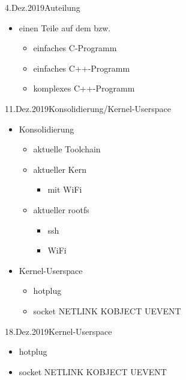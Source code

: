 \documentclass{beamer}
\begin{document}
\begin{frame}{4.Dez.2019}{Auteilung }
 \begin{itemize}
 \item einen Teile auf dem \host bzw. \target 
 \begin{itemize}
  \item einfaches C-Programm
  \item einfaches C++-Programm
  \item komplexes C++-Programm
 \end{itemize}
 \end{itemize}
\end{frame}

\begin{frame}{11.Dez.2019}{Konsolidierung/Kernel-Userspace}
 \begin{itemize}
  \item Konsolidierung
  \begin{itemize}
   \item aktuelle Toolchain
   \item aktueller Kern
   \begin{itemize}
    \item mit WiFi
   \end{itemize}
   \item aktueller rootfs
   \begin{itemize}
    \item ssh
    \item WiFi
   \end{itemize} 
  \end{itemize}
  \item  Kernel-Userspace
  \begin{itemize}
   \item hotplug
   \item socket NETLINK KOBJECT UEVENT
  \end{itemize}
  
 \end{itemize}
 
\end{frame}

\begin{frame}{18.Dez.2019}{Kernel-Userspace}
 \begin{itemize}
  \item hotplug
  \item socket NETLINK KOBJECT UEVENT
 \end{itemize}
\end{frame}
\end{document}

